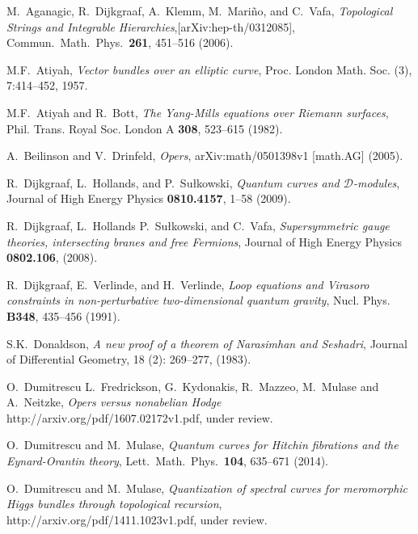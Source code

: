 \documentclass[oneside, 11pt]{amsart}
\theoremstyle{definition}
\numberwithin{equation}{subsection}
\newcommand{\cD}{{\mathcal{D}}}
\begin{document}
{%
\begin{thebibliography}{10}

 M.~Aganagic, R.~Dijkgraaf, A.~Klemm, M.~Mari\~no, and C.~Vafa,
\emph{Topological Strings and Integrable Hierarchies},[arXiv:hep-th/0312085], 
Commun.\ Math.\ Phys.\ \textbf{261}, 451--516 (2006).


  M.F.~Atiyah, \emph{Vector bundles over an elliptic curve}, Proc. London Math. Soc. (3), 7:414–452, 1957.


 
M.F.~Atiyah and R.~Bott, 
\emph{The Yang-Mills equations over Riemann surfaces},
Phil. Trans. Royal Soc. London A \textbf{308}, 523--615  (1982).

 A.~Beilinson and V.~Drinfeld, \emph{Opers}, arXiv:math/0501398v1 [math.AG] (2005).




 R.~Dijkgraaf, L.~Hollands, and P.~Su\l kowski, \emph{Quantum curves and $\cD$-modules}, Journal of High Energy Physics \textbf{0810.4157}, 1--58 (2009).
	
 R.~Dijkgraaf, L.~Hollands P.~Su\l kowski,
and C.~Vafa, \emph{Supersymmetric gauge theories, intersecting branes and free Fermions},
Journal of High Energy Physics \textbf{0802.106},  (2008).


 R.~Dijkgraaf, E.~Verlinde, and H.~Verlinde,
\emph{Loop equations and {V}irasoro constraints in non-perturbative two-dimensional quantum gravity}, Nucl. Phys. \textbf{B348}, 435--456 (1991).

 



 S.K.~Donaldson, \emph{A new proof of a theorem of Narasimhan and Seshadri}, Journal of Differential Geometry, 18 (2): 269–277, (1983).


 O.~Dumitrescu L.~Fredrickson, G.~Kydonakis, R.~Mazzeo, M.~Mulase and A.~Neitzke, {\it Opers versus nonabelian Hodge} http://arxiv.org/pdf/1607.02172v1.pdf, under review.

 O.~Dumitrescu and M.~Mulase,
{\it Quantum curves for Hitchin fibrations and the Eynard-Orantin theory}, Lett.\ Math.\ Phys.\ \textbf{104}, 635--671 (2014).

 O.~Dumitrescu and M.~Mulase, {\it Quantization of spectral curves for meromorphic Higgs bundles through topological recursion}, http://arxiv.org/pdf/1411.1023v1.pdf, under review.


\end{thebibliography}}
\end{document}
